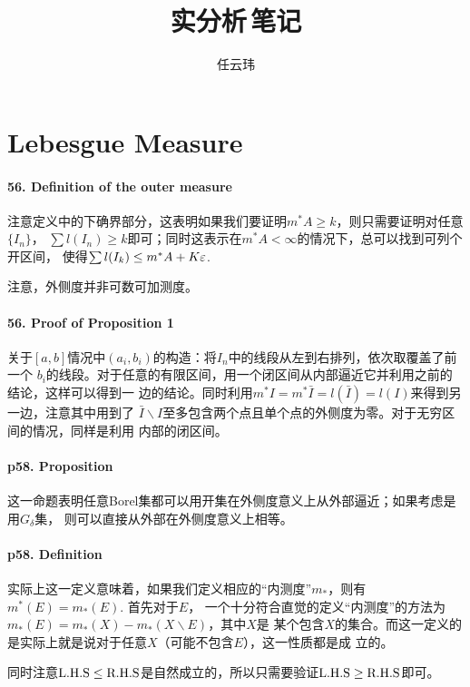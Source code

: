 

\title{实分析$\,$笔记}
\author{任云玮}
\date{}



\maketitle
\tableofcontents

\newpage
\setcounter{section}{2}
\section{Lebesgue Measure}
  \paragraph{56. Definition of the outer measure}
    注意定义中的下确界部分，这表明如果我们要证明$m^*A\ge k$，则只需要证明对任意$\{I_n\}$，
    $\sum l(I_n)\ge k$即可；同时这表示在$m^*A<\infty$的情况下，总可以找到可列个开区间，
    使得$\sum l(I_k) \le m^*A + K\varepsilon$.\par
    注意，外侧度并非可数可加测度。

  \paragraph{56. Proof of Proposition 1}
    关于$[a,b]$情况中$(a_i,b_i)$的构造：将$I_n$中的线段从左到右排列，依次取覆盖了前一个
    $b_i$的线段。对于任意的有限区间，用一个闭区间从内部逼近它并利用之前的结论，这样可以得到一
    边的结论。同时利用$m^*I = m^*\bar{I}=l(\bar{I})=l(I)$来得到另一边，注意其中用到了
    $\bar{I}\backslash I$至多包含两个点且单个点的外侧度为零。对于无穷区间的情况，同样是利用
    内部的闭区间。

  \paragraph{p58. Proposition}
    这一命题表明任意Borel集都可以用开集在外侧度意义上从外部逼近；如果考虑是用$G_\delta$集，
    则可以直接从外部在外侧度意义上相等。

  \paragraph{p58. Definition}
    实际上这一定义意味着，如果我们定义相应的“内测度”$m_*$，则有$m^*(E)=m_*(E)$. 首先对于$E$，
    一个十分符合直觉的定义“内测度”的方法为$m_*(E)=m_*(X)-m_*(X\backslash E)$，其中$X$是
    某个包含$X$的集合。而这一定义的是实际上就是说对于任意$X$（可能不包含$E$），这一性质都是成
    立的。\par
    同时注意$\text{L.H.S}\le\text{R.H.S}$是自然成立的，所以只需要验证$\text{L.H.S}\ge\text{R.H.S}$即可。

